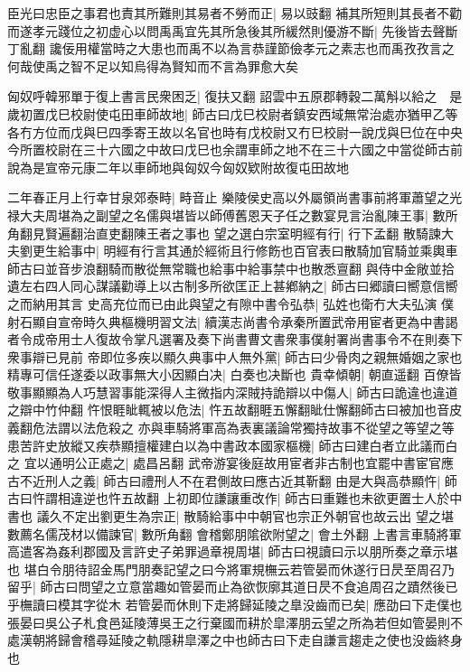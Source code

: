 臣光曰忠臣之事君也責其所難則其易者不勞而正|{
	易以豉翻}
補其所短則其長者不勸而遂孝元踐位之初虚心以問禹禹宜先其所急後其所緩然則優游不斷|{
	先後皆去聲斷丁亂翻}
讒佞用權當時之大患也而禹不以為言恭謹節儉孝元之素志也而禹孜孜言之何哉使禹之智不足以知烏得為賢知而不言為罪愈大矣

匈奴呼韓邪單于復上書言民衆困乏|{
	復扶又翻}
詔雲中五原郡轉穀二萬斛以給之　是歲初置戊巳校尉使屯田車師故地|{
	師古曰戊巳校尉者鎮安西域無常治處亦猶甲乙等各冇方位而戊與巳四季寄王故以名官也時有戊校尉又冇巳校尉一說戊與巳位在中央今所置校尉在三十六國之中故曰戊巳也余謂車師之地不在三十六國之中當從師古前說為是宣帝元康二年以車師地與匈奴今匈奴欵附故復屯田故地}


二年春正月上行幸甘泉郊泰畤|{
	畤音止}
樂陵侯史高以外屬領尚書事前將軍蕭望之光禄大夫周堪為之副望之名儒與堪皆以師傅舊恩天子任之數宴見言治亂陳王事|{
	數所角翻見賢遍翻治直吏翻陳王者之事也}
望之選白宗室明經有行|{
	行下孟翻}
散騎諫大夫劉更生給事中|{
	明經有行言其通於經術且行修飭也百官表曰散騎加官騎並乘輿車師古曰並音步浪翻騎而散從無常職也給事中給事禁中也散悉亶翻}
與侍中金敞並拾遺左右四人同心謀議勸導上以古制多所欲匡正上甚鄕納之|{
	師古曰郷讀曰嚮意信嚮之而納用其言}
史高充位而已由此與望之有隙中書令弘恭|{
	弘姓也衛冇大夫弘演}
僕射石顯自宣帝時久典樞機明習文法|{
	續漢志尚書令承秦所置武帝用宦者更為中書謁者令成帝用士人復故令掌凡選署及奏下尚書曹文書衆事僕射署尚書事令不在則奏下衆事辯已見前}
帝即位多疾以顯久典事中人無外黨|{
	師古曰少骨肉之親無婚姻之家也}
精專可信任遂委以政事無大小因顯白决|{
	白奏也决斷也}
貴幸傾朝|{
	朝直遥翻}
百僚皆敬事顯顯為人巧慧習事能深得人主微指内深賊持詭辯以中傷人|{
	師古曰詭違也違道之辯中竹仲翻}
忤恨睚眦輒被以危法|{
	忤五故翻睚五懈翻眦仕懈翻師古曰被加也音皮義翻危法謂以法危殺之}
亦與車騎將軍高為表裏議論常獨持故事不從望之等望之等患苦許史放縱又疾恭顯擅權建白以為中書政本國家樞機|{
	師古曰建白者立此議而白之}
宜以通明公正處之|{
	處昌呂翻}
武帝游宴後庭故用宦者非古制也宜罷中書宦官應古不近刑人之義|{
	師古曰禮刑人不在君側故曰應古近其靳翻}
由是大與高恭顯忤|{
	師古曰忤謂相違逆也忤五故翻}
上初即位謙讓重改作|{
	師古曰重難也未欲更置士人於中書也}
議久不定出劉更生為宗正|{
	散騎給事中中朝官也宗正外朝官也故云出}
望之堪數薦名儒茂材以備諫官|{
	數所角翻}
會稽鄭朋隂欲附望之|{
	會土外翻}
上書言車騎將軍高遣客為姦利郡國及言許史子弟罪過章視周堪|{
	師古曰視讀曰示以朋所奏之章示堪也}
堪白令朋待詔金馬門朋奏記望之曰今將軍規橅云若管晏而休遂行日昃至周召乃留乎|{
	師古曰問望之立意當趣如管晏而止為欲恢廓其道日昃不食追周召之蹟然後已乎橅讀曰模其字從木}
若管晏而休則下走將歸延陵之臯没齒而已矣|{
	應劭曰下走僕也張晏曰吳公子札食邑延陵薄吳王之行棄國而耕於皐澤朋云望之所為若但如管晏則不處漢朝將歸會稽尋延陵之軌隱耕皐澤之中也師古曰下走自謙言趨走之使也没齒終身也}
